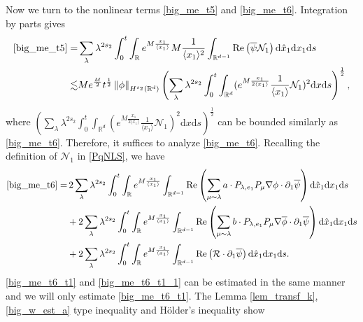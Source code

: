 \documentclass[10pt,twoside,a4paper]{article}
\numberwithin{equation}{section}\allowdisplaybreaks
\begin{document}
Now we turn to the nonlinear terms \eqref{big_me_t5} and \eqref{big_me_t6}.
Integration by parts gives
\begin{align*}
	\eqref{big_me_t5}=	& \sum_{\lambda} \lambda^{ 2s_2} \int_0^t	\int_{\mathbb{R}}e^{M \frac{x_1}{\langle x_1\rangle} }   M \frac{1}{\langle x_1 \rangle^2}\int_{\mathbb{R}^{d-1}}   \mathrm{Re}\left(  \overline{\psi} \mathcal{N}_1\right) \mathrm{d} \hat{x}_1  \mathrm{d} x_1 \mathrm{d} s\\
	\lesssim & M e^{\frac M2}	t^{\frac12} \left\|\phi\right\|_{H^{s_2}(\mathbb{R}^d)} \left( \sum_{\lambda} \lambda^{ 2s_2} \int_0^t \int_{\mathbb{R}^{d}}( e^{M \frac{x_1}{2\langle x_1\rangle} }    \frac{1}{\langle x_1 \rangle}\mathcal{N}_1)^2 \mathrm{d} x \mathrm{d} s \right)^{\frac 12},
\end{align*}
where  $\left( \sum_{\lambda} \lambda^{ 2s_2} \int_0^t \int_{\mathbb{R}^{d}}( e^{M \frac{x_1}{2\langle x_1\rangle} }    \frac{1}{\langle x_1 \rangle}\mathcal{N}_1)^2 \mathrm{d} x \mathrm{d} s \right)^{\frac 12} $ can be bounded similarly as   \eqref{big_me_t6}. Therefore, it suffices to analyze \eqref{big_me_t6}. Recalling the definition of $ \mathcal{N}_1 $ in \eqref{PqNLS}, we have
\begin{align}
	\eqref{big_me_t6}=&\, 2\sum_{\lambda} \lambda^{ 2s_2}\int_0^t	\int_{\mathbb{R}}e^{M \frac{x_1}{\langle x_1\rangle} }    \int_{\mathbb{R}^{d-1}}  \mathrm{Re} \left( \sum_{\mu\sim \lambda} a \cdot  P_{\lambda, e_1}   P_\mu \nabla \phi  \cdot\partial_1  \overline{\psi}\right)   \mathrm{d} \hat{x}_1  \mathrm{d} x_1 \mathrm{d} s \label{big_me_t6_t1}\\
	&+ 2\sum_{\lambda} \lambda^{ 2s_2}\int_0^t	\int_{\mathbb{R}}e^{M \frac{x_1}{\langle x_1\rangle} }    \int_{\mathbb{R}^{d-1}}  \mathrm{Re} \left(  \sum_{\mu\sim \lambda} b\cdot  P_{\lambda, e_1}   P_\mu \nabla\overline{ \phi }\cdot\partial_1  \overline{\psi}\right)   \mathrm{d} \hat{x}_1  \mathrm{d} x_1 \mathrm{d} s \label{big_me_t6_t1_1}\\
	&+2\sum_{\lambda} \lambda^{ 2s_2}\int_0^t	\int_{\mathbb{R}}e^{M \frac{x_1}{\langle x_1\rangle} }   \int_{\mathbb{R}^{d-1}}  \mathrm{Re} \left( \mathcal{R}\cdot\partial_1  \overline{\psi}\right)   \mathrm{d} \hat{x}_1  \mathrm{d} x_1 \mathrm{d} s. \label{big_me_t6_t3}
\end{align}
\eqref{big_me_t6_t1} and \eqref{big_me_t6_t1_1} can be estimated in the same manner and  we will only estimate \eqref{big_me_t6_t1}. 
The Lemma \ref{lem_transf_k}, \eqref{big_w_est_a} type inequality and H\"older's inequality show 
\end{document}
